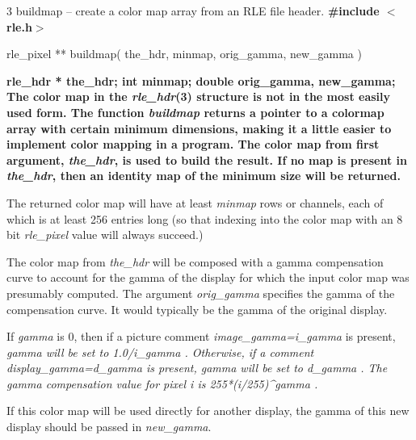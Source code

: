 


%
%
 3
buildmap -- create a color map array from an RLE file header.
\bf
\#include $<$rle.h$>$
\raggedright
\begin{TPlist}{\bf}
\item[{\bf}]
rle\_pixel ** buildmap( the\_hdr, minmap, orig\_gamma, new\_gamma )
\end{TPlist}\par
\bf
rle\_hdr * the\_hdr;
\nwl
\bf
int minmap;
\nwl
\bf
double orig\_gamma, new\_gamma;
The color map in the 
{\it rle\_hdr}{\rm (3)}
structure is not in the most easily used form.  The function
{\it buildmap}
returns a pointer to a colormap array with certain minimum dimensions,
making it a little easier to implement color mapping in a program.
The color map from first argument,
{\it the\_hdr}{\rm ,}
is used to build the result.  If no map is present in
{\it the\_hdr}{\rm ,}
then an identity map of the minimum size will be returned.
\par
The returned color map will have at least
{\it minmap}
rows or channels, each of which is at least 256 entries long (so that
indexing into the color map with an 8 bit 
{\it rle\_pixel}
value will always succeed.)

The color map from 
{\it the\_hdr}
will be composed with a gamma compensation curve to account for the
gamma of the display for which the input color map was presumably computed.
The argument
{\it orig\_gamma}
specifies the gamma of the compensation curve.  It would typically be
the gamma of the original display.

If 
{\it gamma}
is 0, then if a picture comment 
{\it image\_gamma=i\_gamma}
is present, %
\it gamma \rm%
will be set to %
\it 1.0/i\_gamma\rm%
.
Otherwise, if a comment
{\it display\_gamma=d\_gamma}
is present, %
\it gamma \rm%
will be set to %
\it d\_gamma\rm%
.  The gamma
compensation value for pixel %
\it i \rm%
is %
\it 255*(i/255)\^{}gamma\rm%
.

If this color map will be used directly for another display, the gamma
of this new display should be passed in
{\it new\_gamma}{\rm .}


